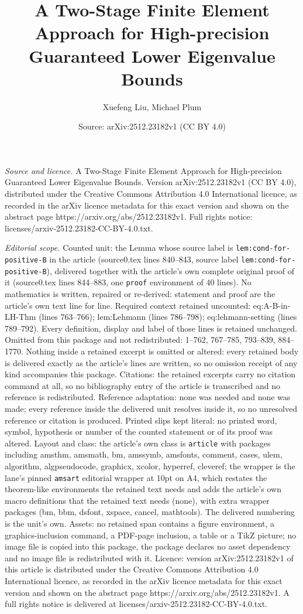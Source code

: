 \documentclass[10pt,a4paper]{amsart}
\title[A Two-Stage Finite Element Approach for High-precision Guara]{A Two-Stage Finite Element Approach for High-precision Guaranteed Lower Eigenvalue Bounds}
\author{Xuefeng Liu, Michael Plum}
\date{Source: arXiv:2512.23182v1 (CC BY 4.0)}
\begin{document}
\maketitle

\noindent\emph{Source and licence.} A Two-Stage Finite Element Approach for High-precision Guaranteed Lower Eigenvalue Bounds. Version arXiv:2512.23182v1 (CC BY 4.0), distributed under the Creative Commons Attribution 4.0 International licence, as recorded in the arXiv licence metadata for this exact version and shown on the abstract page https://arxiv.org/abs/2512.23182v1. Full rights notice: licenses/arxiv-2512.23182-CC-BY-4.0.txt.\par\smallskip

\noindent\textit{Editorial scope.} Counted unit: the Lemma whose source label is \texttt{lem:cond-for-positive-B} in the article (source0.tex lines 840--843, source label \texttt{lem:cond-for-positive-B}), delivered together with the article's own complete original proof of it (source0.tex lines 844--883, one \texttt{proof} environment of 40 lines). No mathematics is written, repaired or re-derived: statement and proof are the article's own text line for line. Required context retained uncounted: eq:A-B-in-LH-Thm (lines 763--766); lem:Lehmann (lines 786--798); eq:lehmann-setting (lines 789--792). Every definition, display and label of those lines is retained unchanged. Omitted from this package and not redistributed: 1--762, 767--785, 793--839, 884--1770. Nothing inside a retained excerpt is omitted or altered: every retained body is delivered exactly as the article's lines are written, so no omission receipt of any kind accompanies this package. Citations: the retained excerpts carry no citation command at all, so no bibliography entry of the article is transcribed and no reference is redistributed. Reference adaptation: none was needed and none was made; every reference inside the delivered unit resolves inside it, so no unresolved reference or citation is produced. Printed slips kept literal: no printed word, symbol, hypothesis or number of the counted statement or of its proof was altered. Layout and class: the article's own class is \texttt{article} with packages including amsthm, amsmath, bm, amssymb, amsfonts, comment, cases, ulem, algorithm, algpseudocode, graphicx, xcolor, hyperref, cleveref; the wrapper is the lane's pinned \texttt{amsart} editorial wrapper at 10pt on A4, which restates the theorem-like environments the retained text needs and adds the article's own macro definitions that the retained text needs (none), with extra wrapper packages (bm, bbm, dsfont, xspace, cancel, mathtools). The delivered numbering is the unit's own. Assets: no retained span contains a figure environment, a graphics-inclusion command, a PDF-page inclusion, a table or a TikZ picture; no image file is copied into this package, the package declares no asset dependency and no image file is redistributed with it. Licence: version arXiv:2512.23182v1 of this article is distributed under the Creative Commons Attribution 4.0 International licence, as recorded in the arXiv licence metadata for this exact version and shown on the abstract page https://arxiv.org/abs/2512.23182v1. A full rights notice is delivered at licenses/arxiv-2512.23182-CC-BY-4.0.txt. 
\end{document}
